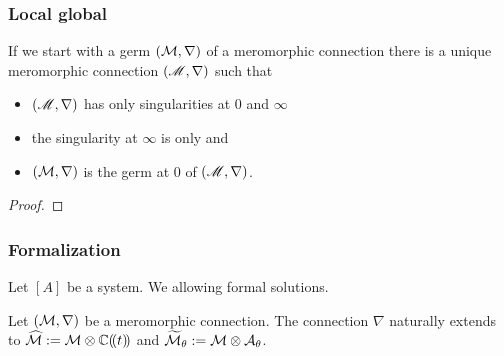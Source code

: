 \subsubsection{Local \rightarrow{} global}
\begin{paracol}{2}\sloppy
\switchcolumn[0]\noindent
  \begin{thm}
    \begin{comment}
      \cite[Thm.3.3.1]{sibuya1990Linear}: G. D. Birkhoff
    \end{comment}
  \end{thm}
\switchcolumn[1]\noindent
  \begin{thm}
    \begin{comment}
      Quelle?
      \begin{itemize}
        \item \cite{sabbah2007isomonodromic}???
      \end{itemize}
    \end{comment}
    If we start with a germ $(\mathcal{M},\nabla)$ of a meromorphic connection there is
    a unique meromorphic connection $(\mathscr{M},\nabla)$ such that
    \begin{itemize}
      \item $(\mathscr{M},\nabla)$ has only singularities at $0$ and $\infty$
      \item the singularity at $\infty$ is only \TODO{} and
      \item $(\mathcal{M},\nabla)$ is the germ at $0$ of $(\mathscr{M},\nabla)$.
    \end{itemize}
  \end{thm}
  \begin{proof}
    \TODO{}
  \end{proof}
\end{paracol}

\subsubsection{Formalization}
\begin{multicols}{2}
  Let $[A]$ be a system. We  allowing
  formal solutions.
  \TODO{}

\columnbreak

  Let $(\mathcal{M},\nabla)$ be a meromorphic connection. The connection $\nabla$
  naturally extends to $\widehat{\mathcal{M}}:=\mathcal{M}\otimes\mathbb{C}(\!(t)\!)$ and
  $\widetilde{\mathcal{M}}_\theta:=\mathcal{M}\otimes\mathcal{A}_\theta$.
  \TODO{}
\end{multicols}

